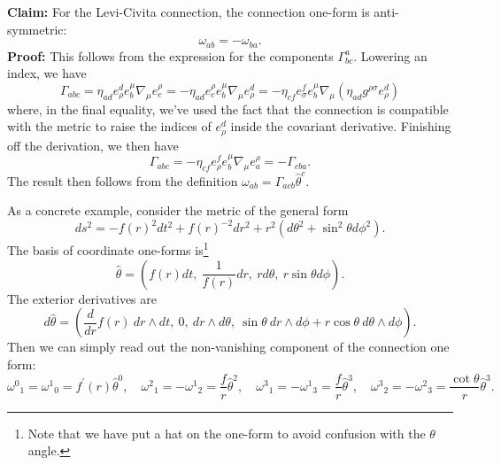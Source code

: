 \documentclass[aps,prb,superscriptaddress,nofootinbib]{revtex4}
\begin{document}
\noindent\textbf{Claim:} For the Levi-Civita connection, the connection one-form is anti-symmetric:
\begin{equation}
	\omega_{a b}=-\omega_{b a}.
\end{equation}
\textbf{Proof:} This follows from the expression for the components $\Gamma_{b c}^a$. 
Lowering an index, we have
$$
\Gamma_{a b c}=\eta_{a d} e^d_\rho e_b^\mu \nabla_\mu e_c^\rho=-\eta_{a d} e_c^\rho e_b^\mu \nabla_\mu e^d_\rho=-\eta_{c f} e^f_\sigma e_b^\mu \nabla_\mu\left(\eta_{a d} g^{\rho \sigma} e^d_\rho\right)
$$
where, in the final equality, we've used the fact that the connection is compatible with the metric to raise the indices of $e_\rho^d$ inside the covariant derivative. Finishing off the derivation, we then have
$$
\Gamma_{a b c}=-\eta_{c f} e^f_\rho e_b^\mu \nabla_\mu e_a^\rho=-\Gamma_{c b a}.
$$
The result then follows from the definition $\omega_{a b}=\Gamma_{a c b} \hat{\theta}^c$.

As a concrete example, consider the metric of the general form
\begin{equation}\label{eq:general-sphere-metric}
	ds^2 = - f(r)^2 dt^2 + f(r)^{-2} dr^2 + r^2 \left(d\theta^2+\sin^2\theta d\phi^2 \right).
\end{equation}
The basis of coordinate one-forms is\footnote{Note that we have put a hat on the one-form to avoid confusion with the $\theta$ angle.}
$$
	\hat{\theta} = \left(f(r) d t,\ \frac{1}{f(r)} d r,\ r d \theta,\ r \sin \theta d \phi \right).
$$
The exterior derivatives are
$$
	d \hat{\theta} = \left(\frac{d}{dr}f(r)\ d r \wedge d t, \ 0, \ d r \wedge d \theta, \ \sin \theta\ d r \wedge d \phi+r \cos \theta\ d \theta \wedge d \phi \right).
$$
Then we can simply read out the non-vanishing component of the connection one form:
\begin{equation*}
	\omega^0{}_1 =  \omega^1{}_0 = f^{\prime}(r) \hat{\theta}^0, \quad 
	\omega^2{}_1 = -\omega^1{}_2 = \frac{f}{r} \hat{\theta}^2, \quad
	\omega^3{}_1 = -\omega^1{}_3 = \frac{f}{r} \hat{\theta}^3, \quad 
	\omega^3{}_2 = -\omega^2{}_3 = \frac{\cot \theta}{r} \hat{\theta}^3.
\end{equation*}
\end{document}
